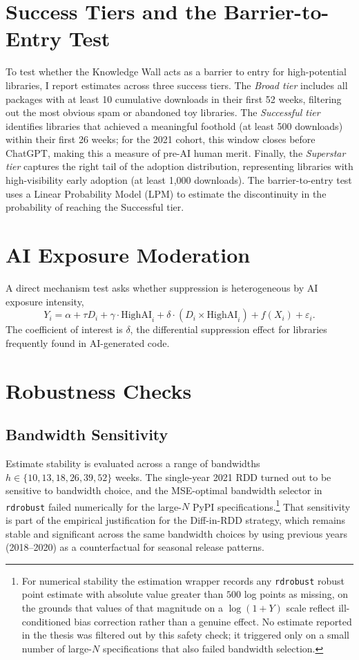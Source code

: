 \documentclass[12pt, a4paper]{report}
\begin{document}
\section{Success Tiers and the Barrier-to-Entry Test}\label{sec:methods-barrier}
To test whether the Knowledge Wall acts as a barrier to entry for high-potential libraries, I report estimates across three success tiers. The \textit{Broad tier} includes all packages with at least 10 cumulative downloads in their first 52 weeks, filtering out the most obvious spam or abandoned toy libraries. The \textit{Successful tier} identifies libraries that achieved a meaningful foothold (at least 500 downloads) within their first 26 weeks; for the 2021 cohort, this window closes before ChatGPT, making this a measure of pre-AI human merit. Finally, the \textit{Superstar tier} captures the right tail of the adoption distribution, representing libraries with high-visibility early adoption (at least 1,000 downloads). The barrier-to-entry test uses a Linear Probability Model (LPM) to estimate the discontinuity in the probability of reaching the Successful tier.

\section{AI Exposure Moderation}\label{sec:methods-mechanism}
A direct mechanism test asks whether suppression is heterogeneous by AI exposure intensity,
$$Y_i = \alpha + \tau D_i + \gamma \cdot \text{HighAI}_i + \delta \cdot (D_i \times \text{HighAI}_i) + f(X_i) + \varepsilon_i.$$
The coefficient of interest is $\delta$, the differential suppression effect for libraries frequently found in AI-generated code.

\section{Robustness Checks}\label{sec:methods-robustness}

\subsection{Bandwidth Sensitivity}\label{subsec:rob-bw}
Estimate stability is evaluated across a range of bandwidths $h \in \{10, 13, 18, 26, 39, 52\}$ weeks. The single-year 2021 RDD turned out to be sensitive to bandwidth choice, and the MSE-optimal bandwidth selector \citep{imbens2012optimal, calonico2020rdrobust} in \texttt{rdrobust} failed numerically for the large-$N$ PyPI specifications.\footnote{For numerical stability the estimation wrapper records any \texttt{rdrobust} robust point estimate with absolute value greater than $500$ log points as missing, on the grounds that values of that magnitude on a $\log(1+Y)$ scale reflect ill-conditioned bias correction rather than a genuine effect. No estimate reported in the thesis was filtered out by this safety check; it triggered only on a small number of large-$N$ specifications that also failed bandwidth selection.} That sensitivity is part of the empirical justification for the Diff-in-RDD strategy, which remains stable and significant across the same bandwidth choices by using previous years (2018--2020) as a counterfactual for seasonal release patterns.
\end{document}
